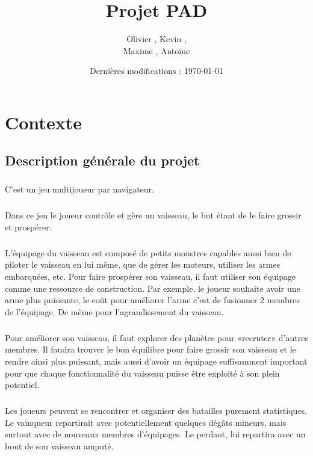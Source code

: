 \documentclass[a4paper,11pt]{report}
\title{Projet PAD}
\author{Olivier \bsc{Boissard}, Kevin \bsc{Boulala},\\
Maxime \bsc{Dubois}, Antoine \bsc{Lavier}}
\date{Dernières modifications : \today}
\begin{document}
\maketitle
\tableofcontents

\chapter{Contexte}
    \section{Description générale du projet}
    \paragraph{}
    C'est un jeu multijoueur par navigateur.
    \paragraph{}
    Dans ce jeu le joueur contrôle et gère un vaisseau, le but étant de le faire grossir et prospérer.
    \paragraph{}
    L’équipage du vaisseau est composé de petits monstres capables aussi bien de piloter le vaisseau en lui même, que de gérer les moteurs, utiliser les armes embarquées, etc. Pour faire prospérer son vaisseau, il faut utiliser son équipage comme une ressource de construction. Par exemple, le joueur souhaite avoir une arme plus puissante, le coût pour améliorer l’arme c’est de fusionner 2 membres de l’équipage. De même pour l’agrandissement du vaisseau.
    \paragraph{}
    Pour améliorer son vaisseau, il faut explorer des planètes pour «recruter» d’autres membres. Il faudra trouver le bon équilibre pour faire grossir son vaisseau et le rendre ainsi plus puissant, mais aussi d’avoir un équipage suffisamment important pour que chaque fonctionnalité du vaisseau puisse être exploité à son plein potentiel.
    \paragraph{}
    Les joueurs peuvent se rencontrer et organiser des batailles purement statistiques. Le vainqueur repartirait avec potentiellement quelques dégâts mineurs, mais surtout avec de nouveaux membres d’équipages. Le perdant, lui repartira avec un bout de son vaisseau amputé.
\end{document}
